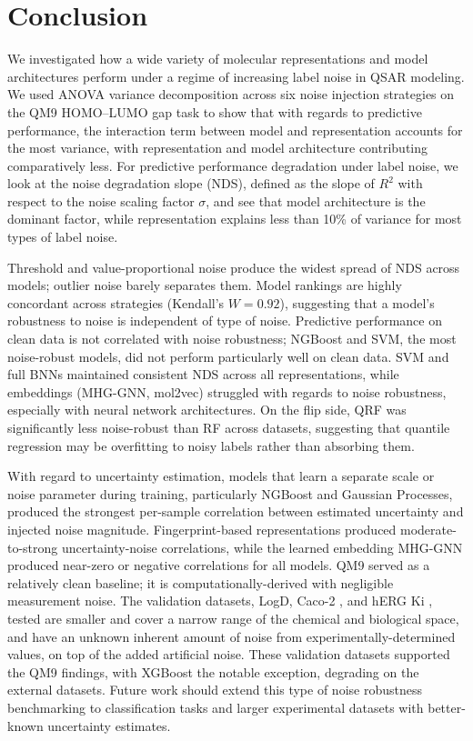 \documentclass[pdflatex,sn-basic]{sn-jnl}%
\theoremstyle{thmstyleone}%
\theoremstyle{thmstyletwo}%
\theoremstyle{thmstylethree}%
\begin{document}
\section{Conclusion}\label{sec13} 

We investigated how a wide variety of molecular representations and model architectures perform under a regime of increasing label noise in QSAR modeling. We used ANOVA variance decomposition across six noise injection strategies on the QM9 HOMO--LUMO gap task to show that with regards to predictive performance, the interaction term between model and representation accounts for the most variance, with representation and model architecture contributing comparatively less. For predictive performance degradation under label noise, we look at the noise degradation slope (NDS), defined as the slope of $R^2$ with respect to the noise scaling factor $\sigma$, and see that model architecture is the dominant factor, while representation explains less than 10\% of variance for most types of label noise.

Threshold and value-proportional noise produce the widest spread of NDS across models; outlier noise barely separates them. Model rankings are highly concordant across strategies (Kendall's $W = 0.92$), suggesting that a model's robustness to noise is independent of type of noise. Predictive performance on clean data is not correlated with noise robustness; NGBoost and SVM, the most noise-robust models, did not perform particularly well on clean data. SVM and full BNNs maintained consistent NDS across all representations, while embeddings (MHG-GNN, mol2vec) struggled with regards to noise robustness, especially with neural network architectures. On the flip side, QRF was significantly less noise-robust than RF across datasets, suggesting that quantile regression may be overfitting to noisy labels rather than absorbing them.

With regard to uncertainty estimation, models that learn a separate scale or noise parameter during training, particularly NGBoost and Gaussian Processes, produced the strongest per-sample correlation between estimated uncertainty and injected noise magnitude. Fingerprint-based representations produced moderate-to-strong uncertainty-noise correlations, while the learned embedding MHG-GNN produced near-zero or negative correlations for all models. QM9 served as a relatively clean baseline; it is computationally-derived with negligible measurement noise. The validation datasets, LogD, Caco-2 \citep{openadmet}, and hERG Ki \citep{Zdrazil2023}, tested are smaller and cover a narrow range of the chemical and biological space, and have an unknown inherent amount of noise from experimentally-determined values, on top of the added artificial noise. These validation datasets supported the QM9 findings, with XGBoost the notable exception, degrading on the external datasets. Future work should extend this type of noise robustness benchmarking to classification tasks and larger experimental datasets with better-known uncertainty estimates.
\end{document}
